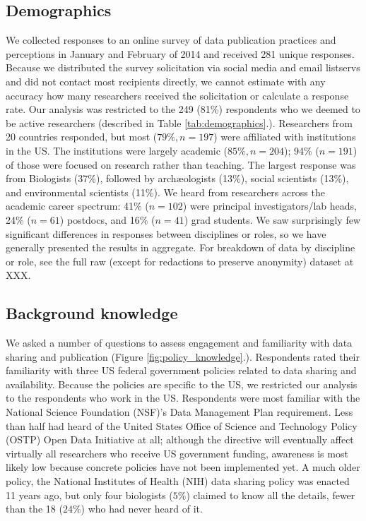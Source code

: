 \documentclass[10pt]{article}
\begin{document}
\subsection*{Demographics}

We collected responses to an online survey of data publication practices and perceptions in January and February of 2014 and received 281 unique responses.
Because we distributed the survey solicitation via social media and email listservs and did not contact most recipients directly, we cannot estimate with any accuracy how many researchers received the solicitation or calculate a response rate.
Our analysis was restricted to the 249 (81\%) respondents who we deemed to be active researchers (described in Table \ref{tab:demographics}.).
Researchers from 20 countries responded, but most ($79\%, n=197$) were affiliated with institutions in the US.
The institutions were largely academic ($85\%, n=204$); 94\% ($n=191$) of those were focused on research rather than teaching. 
The largest response was from Biologists (37\%), followed by arch{\ae}ologists (13\%), social scientists (13\%), and environmental scientists (11\%).
We heard from researchers across the academic career spectrum: 41\% ($n=102$) were principal investigators/lab heads, 24\% ($n=61$) postdocs, and 16\% ($n=41$) grad students.
We saw surprisingly few significant differences in responses between disciplines or roles, so we have generally presented the results in aggregate.
For breakdown of data by discipline or role, see the full raw (except for redactions to preserve anonymity) dataset at XXX. %

\subsection*{Background knowledge}

We asked a number of questions to assess engagement and familiarity with data sharing and publication (Figure \ref{fig:policy_knowledge}.).
Respondents rated their familiarity with three US federal government policies related to data sharing and availability.
Because the policies are specific to the US, we restricted our analysis to the respondents who work in the US.
Respondents were most familiar with the National Science Foundation (NSF)'s Data Management Plan requirement\cite{national_science_foundation_gpg_2011}.
Less than half had heard of the United States Office of Science and Technology Policy (OSTP) Open Data Initiative\cite{obama_making_2013} at all; although the directive will eventually affect virtually all researchers who receive US government funding, awareness is most likely low because concrete policies have not been implemented yet. 
A much older policy, the National Institutes of Health (NIH) data sharing policy\cite{national_institutes_of_health_final_2003} was enacted 11 years ago, but only four biologists ($5\%$) claimed to know all the details, fewer than the 18 ($24\%$) who had never heard of it.
\end{document}
